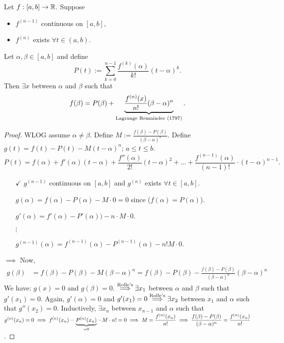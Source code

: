 \documentclass[]{article}
\begin{document}
\begin{theorem}
	\label{thm-5-15}
	Let $f:[a,b]\ra\mb R$. Suppose
	\begin{itemize}
		\item $f^{(n-1)}$ continuous on $[a,b]$,
		\item $f^{(n)}$ exists $\forall t\in(a,b)$.
	\end{itemize}
	Let $\alpha,\beta\in[a,b]$ and define
	$$P(t) := \sum_{k=0}^{n-1} \frac{f^{(k)}(\alpha)}{k!}(t-\alpha)^k.$$
	Then $\exists x$ between $\alpha$ and $\beta$ such that $$ f(\beta) = P(\beta) + \ub{\text{Lagrange Remainder (1797)}}{\frac{f^{(n)}(x)}{n!}(\beta-\alpha)^n} .$$
\end{theorem}
\begin{proof}
	WLOG assume $\alpha\neq\beta$. Define $M:= \frac{f(\beta)-P(\beta)}{(\beta-\alpha)^n}$.
	Define $g(t) = f(t) - P(t) - M(t-\alpha)^n$; $a\leq t\leq b$.
	$$P(t) = f(\alpha) + f'(\alpha)(t-\alpha) + \frac{f''(\alpha)}{2!}(t-\alpha)^2 + \dots + \frac{f^{(n-1)}(\alpha)}{(n-1)!}\cdot(t-\alpha)^{n-1}.$$
	\begin{enumerate}
		\item[$\checkmark$] $g^{(n-1)}$ continuous on $[a,b]$ and $g^{(n)}$ exists $\forall t\in[a,b]$.
		\item[]
	$g(\alpha) = f(\alpha)-P(\alpha)-M\cdot0 = 0$ since ($f(\alpha)=P(\alpha)$).
\item[] 
	$g'(\alpha) = f'(\alpha)-P'(\alpha)) - n\cdot M\cdot 0$.
\item[] $\vdots$
\item[] $g^{(n-1)}(\alpha) = f^{(n-1)}(\alpha)-P^{(n-1)}(\alpha) - n!M\cdot0$.
	\end{enumerate}
	$\implies$ 
	Now, 
	\begin{align*}
		g(\beta) &= f(\beta)-P(\beta)-M(\beta-\alpha)^n 
				 = f(\beta)-P(\beta)-\frac{f(\beta)-P(\beta)}{(\beta-\alpha)^n}(\beta-\alpha)^n
	\end{align*}
	We have: $g(x) = 0$ and $g(\beta)=0$.
	$\os{\text{Rolle's}}\implies \exists x_1$ between $\alpha$ and $\beta$ such that $g'(x_1)=0$.
	Again, $g'(\alpha) = 0$ and $g'(x_1) = 0 \os{\text{Rolle's}}\implies \exists x_2$ between $x_1$ and $\alpha$ such that $g''(x_2)=0$.
	Inductively, $\exists x_n$ between $x_{n-1}$ and $\alpha$ such that $\ds g^{(n)}(x_n) = 0 \implies f^{(n)}(x_n)-\ub{=0}{P^{(n)}(x_n)} - M\cdot n!=0\implies M = \frac{f^{(n)}(x_n)}{n!} \implies \frac{f(\beta)-P(\beta)}{(\beta-\alpha)^n} = \frac{f^{(n)}(x_n)}{n!}$.	
\end{proof}
\end{document}
